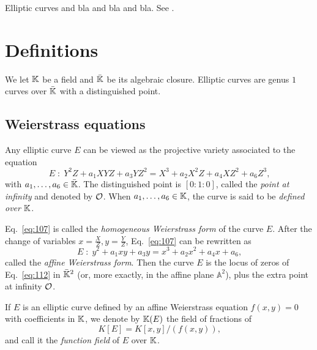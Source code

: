 Elliptic curves and bla and bla and bla. See
\cite{silverman:elliptic,silverman:advanced,blake+seroussi+smart}.

\section{Definitions}
\label{sec:definitions}

We let $\mathbb{K}$ be a field and $\bar{\mathbb{K}}$ be its algebraic
closure. Elliptic curves are genus $1$ curves
over $\bar{\mathbb{K}}$ with a distinguished point.

\subsection{Weierstrass equations}
\label{sec:weierstr-equat}

\begin{definition}
   Any elliptic curve $E$ can be viewed as
  the projective variety associated to the equation
  \begin{equation}
    \label{eq:107}
    E\;:\; Y^2Z + a_1XYZ + a_3YZ^2 = X^3 + a_2X^2Z + a_4XZ^2 + a_6Z^3
    \text{,}
  \end{equation}
  with $a_1,\ldots,a_6\in\bar{\mathbb{K}}$.  The distinguished point is
  $[0:1:0]$, called the \emph{point at
    infinity} and denoted by $\mathcal{O}$.  When $a_1,\ldots,a_6\in\mathbb{K}$, the
  curve is said to be \emph{defined over $\mathbb{K}$}.
\end{definition}

Eq.~\eqref{eq:107} is called the \emph{homogeneous Weierstrass
  form} of the curve $E$.  After
the change of variables $x=\frac{X}{Z},y=\frac{Y}{Z}$,
Eq.~\eqref{eq:107} can be rewritten as
\begin{equation}
  \label{eq:112}
  E\;:\;y^2 + a_1xy + a_3y = x^3 + a_2x^2 + a_4x + a_6
  \text{,}
\end{equation}
called the \emph{affine Weierstrass
  form}. Then the curve $E$ is the
locus of zeros of Eq.~\eqref{eq:112} in $\bar{\mathbb{K}}^2$ (or, more
exactly, in the affine plane $\mathbb{A}^2$), plus the extra point at
infinity $\mathcal{O}$.

\begin{definition}
  If $E$ is an elliptic curve defined by an affine Weierstrass
  equation $f(x,y)=0$ with coefficients in $\mathbb{K}$, we denote by $\mathbb{K}(E)$%
   the
  field of fractions of
  \begin{equation}
    \label{eq:125}
    K[E]=K[x,y]/(f(x,y))
    \text{,}
  \end{equation}
  and call it the \emph{function field} of $E$
  over $\mathbb{K}$.
\end{definition}

